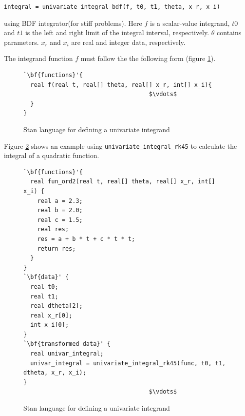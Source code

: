 \documentclass[11pt]{amsart}
\newenvironment{fmpage}[1]
     {\begin{lrbox}{\fmbox}\begin{minipage}{#1}}
     {\end{minipage}\end{lrbox}\fbox{\usebox{\fmbox}}}
\begin{document}
\begin{verbatim}
integral = univariate_integral_bdf(f, t0, t1, theta, x_r, x_i)
\end{verbatim}
using BDF integrator(for stiff problems). Here $f$ is a
scalar-value integrand, $t0$ and $t1$ is the left and right
limit of the integral interval, respectively. $\theta$ contains 
parameters. $x_r$ and $x_i$ are real and integer data,
respectively. 

The integrand function $f$ must follow the the following
form (figure \ref{fig:univariate_integrand}).
\begin{figure}[htbp]
\caption{Stan language for defining a univariate integrand}
\begin{center}
\begin{small}
\begin{fmpage}{\textwidth - .75in}
\begin{lstlisting}[basicstyle=\footnotesize\ttfamily,mathescape=true,flexiblecolumns=true,frame=single,escapeinside=`']
`\bf{functions}'{
  real f(real t, real[] theta, real[] x_r, int[] x_i){
                                    $\vdots$			       
  }
}
\end{lstlisting}
\end{fmpage}
\end{small}
\end{center}
\label{fig:univariate_integrand}
\end{figure}

Figure \ref{fig:univariate_int_example} shows an example using
\texttt{univariate\_integral\_rk45} to calculate the
integral of a quadratic function.
\begin{figure}[htbp]
\caption{Stan language for defining a univariate integrand}
\begin{center}
\begin{small}
\begin{fmpage}{\textwidth - .75in}
\begin{lstlisting}[basicstyle=\footnotesize\ttfamily,mathescape=true,flexiblecolumns=true,frame=single,escapeinside=`']
`\bf{functions}'{
  real fun_ord2(real t, real[] theta, real[] x_r, int[] x_i) {
    real a = 2.3;
    real b = 2.0;
    real c = 1.5;
    real res;
    res = a + b * t + c * t * t;
    return res;
  }
}
`\bf{data}' {
  real t0;
  real t1;
  real dtheta[2];
  real x_r[0];
  int x_i[0];
}
`\bf{transformed data}' {
  real univar_integral;
  univar_integral = univariate_integral_rk45(func, t0, t1, dtheta, x_r, x_i);
}
                                    $\vdots$			       
\end{lstlisting}
\end{fmpage}
\end{small}
\end{center}
\label{fig:univariate_int_example}
\end{figure}
\end{document}
